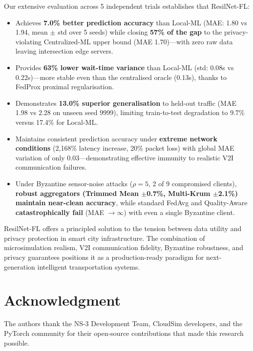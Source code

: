 \documentclass[conference]{IEEEtran}
\begin{document}
Our extensive evaluation across 5 independent trials establishes that ResilNet-FL:
\begin{itemize}
    \item Achieves \textbf{7.0\% better prediction accuracy} than Local-ML (MAE: 1.80 vs 1.94, mean $\pm$ std over 5 seeds) while closing \textbf{57\% of the gap} to the privacy-violating Centralized-ML upper bound (MAE 1.70)—with zero raw data leaving intersection edge servers.
    \item Provides \textbf{63\% lower wait-time variance} than Local-ML (std: 0.08s vs 0.22s)—more stable even than the centralised oracle (0.13s), thanks to FedProx proximal regularisation.
    \item Demonstrates \textbf{13.0\% superior generalisation} to held-out traffic (MAE 1.98 vs 2.28 on unseen seed 9999), limiting train-to-test degradation to 9.7\% versus 17.4\% for Local-ML.
    \item Maintains consistent prediction accuracy under \textbf{extreme network conditions} (2,168\% latency increase, 20\% packet loss) with global MAE variation of only 0.03—demonstrating effective immunity to realistic V2I communication failures.
    \item Under Byzantine sensor-noise attacks ($\rho=5$, 2 of 9 compromised clients), \textbf{robust aggregators (Trimmed Mean $\pm$0.7\%, Multi-Krum $\pm$2.1\%) maintain near-clean accuracy}, while standard FedAvg and Quality-Aware \textbf{catastrophically fail} (MAE $\rightarrow \infty$) with even a single Byzantine client.
\end{itemize}

ResilNet-FL offers a principled solution to the tension between data utility and privacy protection in smart city infrastructure. The combination of microsimulation realism, V2I communication fidelity, Byzantine robustness, and privacy guarantees positions it as a production-ready paradigm for next-generation intelligent transportation systems.

\section*{Acknowledgment}
The authors thank the NS-3 Development Team, CloudSim developers, and the PyTorch community for their open-source contributions that made this research possible.
\end{document}
